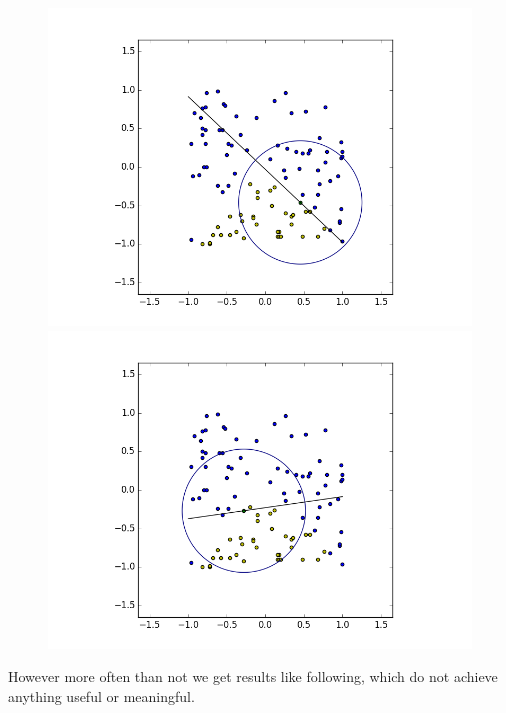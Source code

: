 \documentclass[notitlepage]{report}
\theoremstyle{definition}
\begin{document}
\begin{figure}[H]
  \centering
  \begin{minipage}[b]{0.4\textwidth}
    \includegraphics[width=\textwidth]{BoundaryHunter-Attempt3-R0.png}
    \caption{}
  \end{minipage}
  \hfill
  \begin{minipage}[b]{0.4\textwidth}
    \includegraphics[width=\textwidth]{BoundaryHunter-Attempt3-R1.png}
    \caption{}
  \end{minipage}
  \hfill
\end{figure}

However more often than not we get results like following, which do not achieve anything useful or meaningful.
\end{document}
